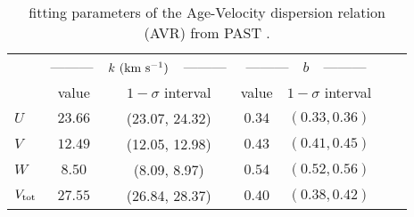 \documentclass[twocolumn]{pnas-new}
\begin{document}
\begin{table*}[!t]
\centering
\renewcommand\arraystretch{1.2}
\caption{fitting parameters of the Age-Velocity dispersion relation (AVR) from PAST \uppercase\expandafter{} \citep{2021ApJ...909..115C}.}
{\footnotesize
\label{tab:AVRkb}
\begin{tabular}{l|cccccc} \hline
                & \multicolumn{2}{c}{---------~~$k \ \rm (km \ s^{-1})$~~---------} & \multicolumn{2}{c}{---------~~$b$~~---------}    \\ 
               &  value &  $1-\sigma$ interval &  value &  $1-\sigma$ interval  \\ \hline
    $U$  & $23.66$ & (23.07, 24.32) & $0.34$ & $(0.33,0.36)$  \\
    $V$  & $12.49$ & (12.05, 12.98) & $0.43$ & $(0.41,0.45)$  \\
    $W$  & $8.50$ & (8.09, 8.97) & $0.54$ & $(0.52,0.56)$ \\
    $V_{\rm tot}$ & $27.55$ & (26.84, 28.37) & $0.40$ & $(0.38, 0.42)$ \\ \hline
 
\end{tabular}}
\end{table*}  
\end{document}
